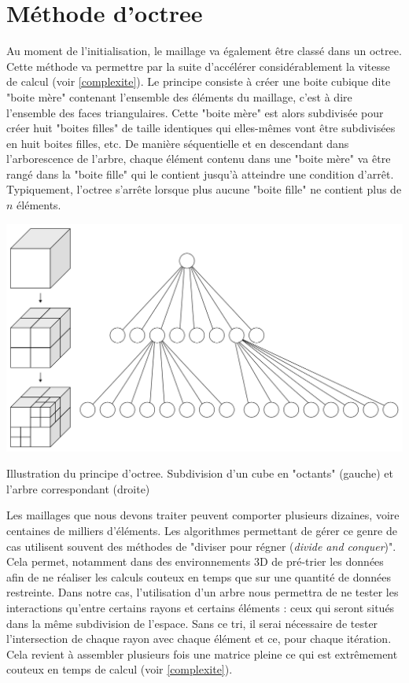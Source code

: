 \section{Méthode d'octree}
Au moment de l'initialisation, le maillage va également être classé dans un \gls{octree}. Cette méthode va permettre par la suite d'accélérer considérablement la vitesse de calcul \cite[p. 5]{octree} (voir \ref{complexite}). Le principe consiste à créer une boite cubique dite "boite mère" contenant l'ensemble des éléments du maillage, c'est à dire l'ensemble des faces triangulaires. Cette "boite mère" est alors subdivisée pour créer huit "boites filles" de taille identiques qui elles-mêmes vont être subdivisées en huit boites filles, etc. De manière séquentielle et en descendant dans l'arborescence de l'arbre, chaque élément contenu dans une "boite mère" va être rangé dans la "boite fille" qui le contient jusqu'à atteindre une condition d'arrêt. Typiquement, l'\gls{octree} s'arrête lorsque plus aucune "boite fille" ne contient plus de $n$ éléments.

\begin{figureth}
	\includegraphics[width=0.6\linewidth]{images/octree}
	\caption{Illustration du principe d'\gls{octree}. Subdivision d'un cube en "octants" (gauche) et l'arbre correspondant (droite)}
	\label{octree}
\end{figureth}

Les maillages que nous devons traiter peuvent comporter plusieurs dizaines, voire centaines de milliers d'éléments. Les algorithmes permettant de gérer ce genre de cas utilisent souvent des méthodes de "diviser pour régner (\textit{divide and conquer})". Cela permet, notamment dans des environnements 3D de pré-trier les données afin de ne réaliser les calculs couteux en temps que sur une quantité de données restreinte. Dans notre cas, l'utilisation d'un arbre nous permettra de ne tester les interactions qu'entre certains rayons et certains éléments : ceux qui seront situés dans la même subdivision de l'espace. Sans ce tri, il serai nécessaire de tester l'intersection de chaque rayon avec chaque élément et ce, pour chaque itération. Cela revient à assembler plusieurs fois une matrice pleine ce qui est extrêmement couteux en temps de calcul (voir \ref{complexite}).


